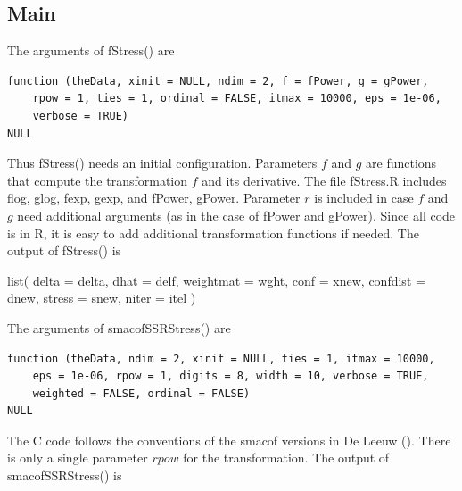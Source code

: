 \documentclass[
  12pt,
  letterpaper,
  DIV=11,
  numbers=noendperiod]{scrartcl}
\newenvironment{Shaded}{\begin{snugshade}}{\end{snugshade}}
\newcommand{\AttributeTok}[1]{\textcolor[rgb]{0.40,0.45,0.13}{#1}}
\newcommand{\FunctionTok}[1]{\textcolor[rgb]{0.28,0.35,0.67}{#1}}
\newcommand{\NormalTok}[1]{\textcolor[rgb]{0.00,0.23,0.31}{#1}}
\begin{document}
\subsection{Main}\label{main}

The arguments of fStress() are

\begin{verbatim}
function (theData, xinit = NULL, ndim = 2, f = fPower, g = gPower, 
    rpow = 1, ties = 1, ordinal = FALSE, itmax = 10000, eps = 1e-06, 
    verbose = TRUE) 
NULL
\end{verbatim}

Thus fStress() needs an initial configuration. Parameters \(f\) and
\(g\) are functions that compute the transformation \(f\) and its
derivative. The file fStress.R includes flog, glog, fexp, gexp, and
fPower, gPower. Parameter \(r\) is included in case \(f\) and \(g\) need
additional arguments (as in the case of fPower and gPower). Since all
code is in R, it is easy to add additional transformation functions if
needed. The output of fStress() is

\begin{Shaded}
\begin{Highlighting}[]
\FunctionTok{list}\NormalTok{(}
    \AttributeTok{delta =}\NormalTok{ delta, }
    \AttributeTok{dhat =}\NormalTok{ delf, }
    \AttributeTok{weightmat =}\NormalTok{ wght,}
    \AttributeTok{conf =}\NormalTok{ xnew,}
    \AttributeTok{confdist =}\NormalTok{ dnew,}
    \AttributeTok{stress =}\NormalTok{ snew,}
    \AttributeTok{niter =}\NormalTok{ itel}
\NormalTok{  )}
\end{Highlighting}
\end{Shaded}

The arguments of smacofSSRStress() are

\begin{verbatim}
function (theData, ndim = 2, xinit = NULL, ties = 1, itmax = 10000, 
    eps = 1e-06, rpow = 1, digits = 8, width = 10, verbose = TRUE, 
    weighted = FALSE, ordinal = FALSE) 
NULL
\end{verbatim}

The C code follows the conventions of the smacof versions in De Leeuw
(). There is only a single parameter
\(rpow\) for the transformation. The output of smacofSSRStress() is
\end{document}
